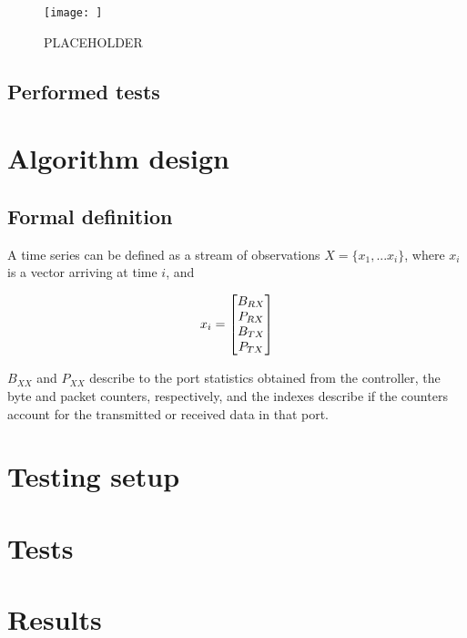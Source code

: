 \pagebreak
\begin{figure} 
    \centering
    \texttt{[image: ]}
    \caption {PLACEHOLDER}
    \label{fig:test_setup}
\end{figure} 

\subsection {Performed tests}

\subsubsection {}


\section {Algorithm design}
\subsection {Formal definition}

A time series can be defined as a stream of observations $X = \{x_1, ... x_i\}$, where $x_i$ is a vector arriving at time $i$, and

\begin {equation}
\centering
x_i = 
\begin{bmatrix}
B_{RX}\\
P_{RX}\\
B_{TX}\\
P_{TX}\\
\end{bmatrix}
\end {equation}

\par $B_{XX}$ and $P_{XX}$ describe to the port statistics obtained from the controller, the byte and packet counters, respectively, and the indexes describe if the counters account for the transmitted or received data in that port.
\section {Testing setup}
\section {Tests}
\section {Results}


